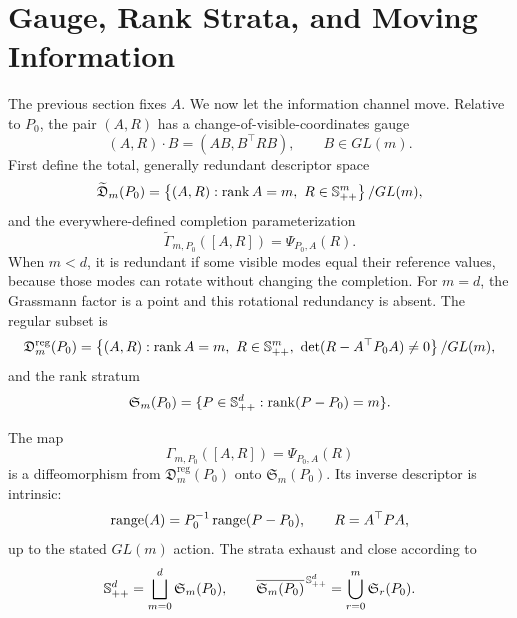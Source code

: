 \section{Gauge, Rank Strata, and Moving Information}
\label{sec:stratified-geometry}

The previous section fixes \(A\).  We now let the information channel move.
Relative to \(P_0\), the pair \((A,R)\) has a change-of-visible-coordinates
gauge
\[
  (A,R)\cdot B=(AB,B^\top RB),
  \qquad B\in GL(m).
\]
First define the total, generally redundant descriptor space
\begin{equation}
  \widetilde{\mathfrak D}_m(P_0)
  =
  \left\{(A,R):\operatorname{rank} A=m,\ R\in\mathbb S_{++}^m\right\}/GL(m),
  \label{eq:total-descriptor-space}
\end{equation}
and the everywhere-defined completion parameterization
\begin{equation}
  \widetilde\Gamma_{m,P_0}([A,R])=\Psi_{P_0,A}(R).
  \label{eq:total-completion-map}
\end{equation}
When \(m<d\), it is redundant if some visible modes equal their reference
values, because those modes can rotate without changing the completion.  For
\(m=d\), the Grassmann factor is a point and this rotational redundancy is
absent.  The regular subset is
\begin{equation}
  \mathfrak D_m^{\mathrm{reg}}(P_0)
  =
  \left\{(A,R):\operatorname{rank} A=m,\ R\in\mathbb S_{++}^m,
  \ \det(R-A^\top P_0A)\ne0\right\}/GL(m),
  \label{eq:descriptor-space}
\end{equation}
and the rank stratum
\begin{equation}
  \mathfrak S_m(P_0)
  =\{P\in\mathbb S_{++}^d:\operatorname{rank}(P-P_0)=m\}.
  \label{eq:rank-stratum}
\end{equation}

\begin{theorem}
\label{thm:rank-stratification}
The map
\begin{equation}
  \Gamma_{m,P_0}([A,R])=\Psi_{P_0,A}(R)
  \label{eq:stratum-map}
\end{equation}
is a diffeomorphism from
\(\mathfrak D_m^{\mathrm{reg}}(P_0)\) onto
\(\mathfrak S_m(P_0)\).  Its inverse descriptor is intrinsic:
\begin{equation}
  \operatorname{range}(A)=P_0^{-1}\operatorname{range}(P-P_0),
  \qquad
  R=A^\top PA,
  \label{eq:intrinsic-descriptor}
\end{equation}
up to the stated \(GL(m)\) action.  The strata exhaust and close according to
\begin{equation}
  \mathbb S_{++}^d=\bigsqcup_{m=0}^d\mathfrak S_m(P_0),
  \qquad
  \overline{\mathfrak S_m(P_0)}^{\,\mathbb S_{++}^d}
  =\bigcup_{r=0}^m\mathfrak S_r(P_0).
  \label{eq:strata-closure}
\end{equation}
\end{theorem}

